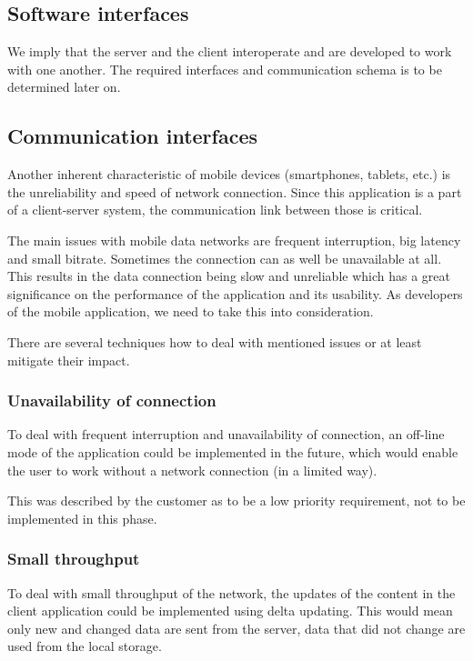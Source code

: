 \documentclass[11pt]{book}
\begin{document}
\subsection{Software interfaces}
We imply that the server and the client interoperate and are developed to work with one another. The required interfaces and communication schema is to be determined later on. %

\subsection{Communication interfaces}
Another inherent characteristic of mobile devices (smartphones, tablets, etc.) is the unreliability and speed of network connection. Since this application is a part of a client-server system, the communication link between those is critical.

The main issues with mobile data networks are frequent interruption, big latency and small bitrate. Sometimes the connection can as well be unavailable at all. This results in the data connection being slow and unreliable which has a great significance on the performance of the application and its usability. As developers of the mobile application, we need to take this into consideration.

There are several techniques how to deal with mentioned issues or at least mitigate their impact.

\subsubsection{Unavailability of connection}\label{sec:req_unavailability_of_connection}
To deal with frequent interruption and unavailability of connection, an off-line mode of the application could be implemented in the future, which would enable the user to work without a network connection (in a limited way).

This was described by the customer as to be a low priority requirement, not to be implemented in this phase.

\subsubsection{Small throughput}
To deal with small throughput of the network, the updates of the content in the client application could be implemented using delta updating. This would mean only new and changed data are sent from the server, data that did not change are used from the local storage.
\end{document}
